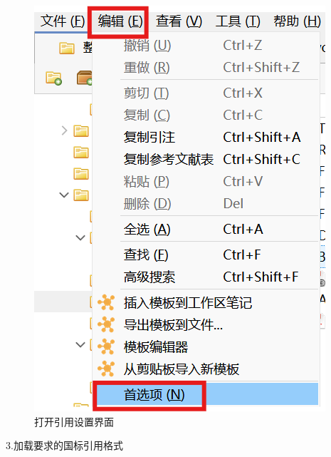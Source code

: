 \documentclass[]{ctexbook}
\theoremstyle{definition}
\theoremstyle{definition}
\theoremstyle{definition}
\theoremstyle{definition}
\theoremstyle{remark}
\begin{document}
\begin{figure}

{\centering \includegraphics[width=1\linewidth]{img/zotero-cite-cn/ciation_setting} 

}

\caption{打开引用设置界面}\label{fig:ciation-setting-interface}
\end{figure}

3.加载要求的国标引用格式
\end{document}
